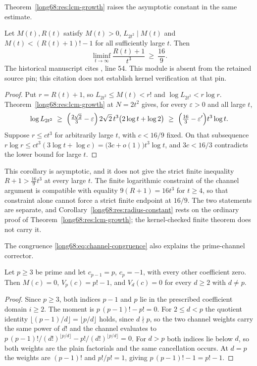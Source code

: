 \documentclass[11pt]{article}
\newcommand{\chn}[2]{V_{#1}(#2)}
\newcommand{\Lc}{L}
\begin{document}
Theorem~\ref{long68:res:lcm-growth} raises the asymptotic constant in the same
estimate.

\begin{corollary}\label{long68:res:radius-constant}
Let $M(t),R(t)$ satisfy $M(t)>0$, $\Lc_{2t^2}\mid M(t)$ and
$M(t)<(R(t)+1)!-1$ for all sufficiently large $t$.  Then
\[
 \liminf_{t\to\infty}\frac{R(t)+1}{t^3}\ \ge\ \frac{16}{9}.
\]
  The historical manuscript cites , line 54. This module is absent from the retained source pin; this citation does not establish kernel verification at that pin.
\end{corollary}

\begin{proof}
Put $r=R(t)+1$, so $\Lc_{2t^2}\le M(t)<r!$ and $\log \Lc_{2t^2}<r\log r$.
Theorem~\ref{long68:res:lcm-growth} at $N=2t^2$ gives, for every $\varepsilon>0$ and
all large $t$,
\[
 \log \Lc_{2t^2}
 \ \ge\ \Bigl(\tfrac{2\sqrt2}{3}-\varepsilon\Bigr)\,2\sqrt2\,t^3
   \bigl(2\log t+\log2\bigr)
 \ \ge\ \Bigl(\tfrac{16}{3}-\varepsilon'\Bigr)t^3\log t .
\]
Suppose $r\le ct^3$ for arbitrarily large $t$, with $c<16/9$ fixed.  On that
subsequence $r\log r\le ct^3(3\log t+\log c)=\bigl(3c+o(1)\bigr)t^3\log t$,
and $3c<16/3$ contradicts the lower bound for large $t$.
\end{proof}

This corollary is asymptotic, and it does not give the strict finite
inequality $R+1>\tfrac{16}9t^3$ at every large $t$.  The finite logarithmic
constraint of the channel argument is compatible with equality
$9(R+1)=16t^3$ for $t\ge4$, so that constraint alone cannot force a strict
finite endpoint at $16/9$.  The two statements are separate, and
Corollary~\ref{long68:res:radius-constant} rests on the ordinary proof of
Theorem~\ref{long68:res:lcm-growth}; the kernel-checked finite theorem does not
carry it.

The congruence \eqref{long68:eq:channel-congruence} also explains the prime-channel
corrector.

\begin{theorem}\label{long68:res:translator}
Let $p\ge3$ be prime and let $c_{p-1}=p$, $c_p=-1$, with every other coefficient
zero.  Then $M(c)=0$, $\chn pc=p!-1$, and $\chn dc=0$ for every $d\ge2$ with
$d\ne p$.
\end{theorem}

\begin{proof}
Since $p\ge3$, both indices $p-1$ and $p$ lie in the prescribed coefficient
domain $i\ge2$.  The moment is $p\,(p-1)!-p!=0$.  For $2\le d<p$ the quotient identity
$\lfloor(p-1)/d\rfloor=\lfloor p/d\rfloor$ holds, since $d\nmid p$, so the
two channel weights carry the same power of $d!$ and the channel evaluates to
$p\,(p-1)!/(d!)^{\lfloor p/d\rfloor}-p!/(d!)^{\lfloor p/d\rfloor}=0$.  For
$d>p$ both indices lie below $d$, so both weights are the plain factorials
and the same cancellation occurs.  At $d=p$ the weights are $(p-1)!$ and
$p!/p!=1$, giving $p\,(p-1)!-1=p!-1$.
\end{proof}
\end{document}
